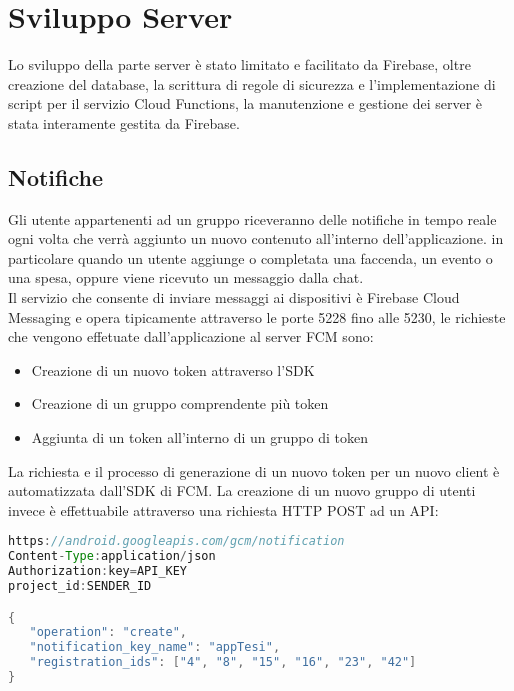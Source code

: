 \chapter{Sviluppo Server}                %
\lhead[\fancyplain{}{\bfseries\thepage}]{\fancyplain{}{\bfseries\rightmark}}

Lo sviluppo della parte server è stato limitato e facilitato da Firebase, oltre creazione del database, la scrittura di regole di sicurezza e l'implementazione di script per il servizio Cloud Functions, la manutenzione e gestione dei server è stata interamente gestita da Firebase.

\section{Notifiche}
Gli utente appartenenti ad un gruppo riceveranno delle notifiche in tempo reale ogni volta che verrà aggiunto un nuovo contenuto all'interno dell'applicazione. in particolare quando un utente aggiunge o completata una faccenda, un evento o una spesa, oppure viene ricevuto un messaggio dalla chat.\\
Il servizio che consente di inviare messaggi ai dispositivi è Firebase Cloud Messaging e opera tipicamente attraverso le porte 5228 fino alle 5230, le richieste che vengono effetuate dall'applicazione al server FCM sono:
\begin{itemize}
    \item Creazione di un nuovo token attraverso l'SDK
    \item Creazione di un gruppo comprendente più token
    \item Aggiunta di un token all'interno di un gruppo di token
\end{itemize}

La richiesta e il processo di generazione di un nuovo token per un nuovo client è automatizzata dall'SDK di FCM.
La creazione di un nuovo gruppo di utenti invece è effettuabile attraverso una richiesta HTTP POST ad un API:

\begin{lstlisting}[language=java,caption={Creazione token FCM}]
https://android.googleapis.com/gcm/notification
Content-Type:application/json
Authorization:key=API_KEY
project_id:SENDER_ID

{
   "operation": "create",
   "notification_key_name": "appTesi",
   "registration_ids": ["4", "8", "15", "16", "23", "42"]
}
\end{lstlisting}

